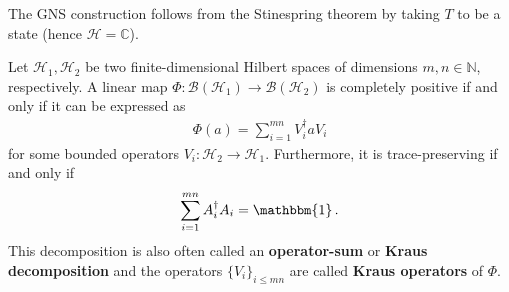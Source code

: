     \begin{result}
        The GNS construction follows from the Stinespring theorem by taking $T$ to be a state (hence $\mathcal{H}=\mathbb{C}$).
    \end{result}

    \begin{result}[Choi]\label{operators:kraus}
        Let $\mathcal{H}_1,\mathcal{H}_2$ be two finite-dimensional Hilbert spaces of dimensions $m,n\in\mathbb{N}$, respectively. A linear map $\Phi:\mathcal{B}(\mathcal{H}_1)\rightarrow\mathcal{B}(\mathcal{H}_2)$ is completely positive if and only if it can be expressed as
        \begin{gather}
            \Phi(a) = \sum_{i=1}^{mn}V^\dagger_iaV_i
        \end{gather}
        for some bounded operators $V_i:\mathcal{H}_2\rightarrow\mathcal{H}_1$. Furthermore, it is trace-preserving if and only if
        \begin{gather}
            \sum_{i=1}^{mn}A^\dag_iA_i = \mathbbm{1}\,.
        \end{gather}
        This decomposition is also often called an \textbf{operator-sum} or \textbf{Kraus decomposition} and the operators $\{V_i\}_{i\leq mn}$ are called \textbf{Kraus operators} of $\Phi$.
    \end{result}

\subsection{}

